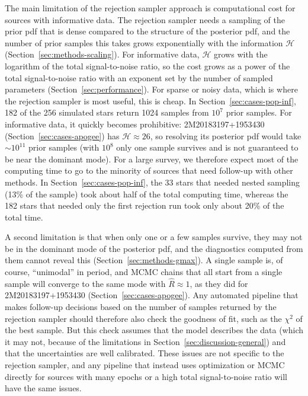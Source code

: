 \documentclass[twocolumn]{AASTeX7/aastex701}
\begin{document}
The main limitation of the rejection sampler approach is computational cost for sources
with informative data.
The rejection sampler needs a sampling of the prior pdf that is dense compared to the
structure of the posterior pdf, and the number of prior samples this takes grows
exponentially with the information $\mathcal{H}$ (Section~\ref{sec:methods-scaling}).
For informative data, $\mathcal{H}$ grows with the logarithm of the total
signal-to-noise ratio, so the cost grows as a power of the total signal-to-noise ratio
with an exponent set by the number of sampled parameters
(Section~\ref{sec:performance}).
For sparse or noisy data, which is where the rejection sampler is most useful, this is
cheap.
In Section~\ref{sec:cases-pop-inf}, 182 of the 256 simulated stars return 1024
samples from $10^7$ prior samples.
For informative data, it quickly becomes prohibitive: 2M20183197+1953430
(Section~\ref{sec:cases-apogee}) has $\mathcal{H} \approx 26$, so resolving its
posterior pdf would take $\sim 10^{11}$ prior samples (with $10^8$ only one sample
survives and is not guaranteed to be near the dominant mode).
For a large survey, we therefore expect most of the computing time to go to the minority
of sources that need follow-up with other methods.
In Section~\ref{sec:cases-pop-inf}, the 33 stars that needed nested sampling (13\% of
the sample) took about half of the total computing time, whereas the 182 stars that
needed only the first rejection run took only about 20\% of the total time.

A second limitation is that when only one or a few samples survive, they may not be in
the dominant mode of the posterior pdf, and the diagnostics computed from them cannot
reveal this (Section~\ref{sec:methods-gmax}).
A single sample is, of course, ``unimodal'' in period, and MCMC chains that all start
from a single sample will converge to the same mode with $\hat{R} \approx 1$, as they
did for 2M20183197+1953430 (Section~\ref{sec:cases-apogee}).
Any automated pipeline that makes follow-up decisions based on the number of samples
returned by the rejection sampler should therefore also check the goodness of fit, such
as the $\chi^2$ of the best sample.
But this check assumes that the model describes the data (which it may not, because of
the limitations in Section~\ref{sec:discussion-general}) and that the uncertainties are
well calibrated.
These issues are not specific to the rejection sampler, and any pipeline that instead
uses optimization or MCMC directly for sources with many epochs or a high total
signal-to-noise ratio will have the same issues.
\end{document}
